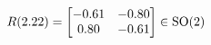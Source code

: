 \documentclass[preview]{standalone}
\begin{document}
\begin{align*}
\special{dvisvgm:raw <g id='unique000'>}R(2.22) = \begin{bmatrix} -0.61 & -0.80 \\ 0.80 & -0.61 \end{bmatrix} \in \text{SO}(2)\special{dvisvgm:raw </g>}
\end{align*}
\end{document}
